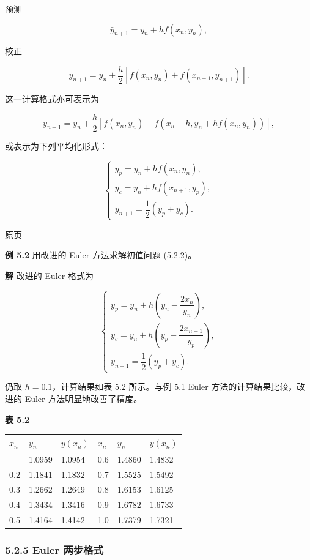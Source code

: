 \documentclass[
  10pt,
  fontset=fandol]{ctexart}
\newcounter{none} %
\begin{document}
预测

\[
\bar y_{n+1}=y_n+hf(x_n,y_n),\tag{5.2.10}
\]

校正

\[
y_{n+1}=y_n+\frac{h}{2}[f(x_n,y_n)+f(x_{n+1},\bar y_{n+1})].\tag{5.2.11}
\]

这一计算格式亦可表示为

\[
y_{n+1}=y_n+\frac{h}{2}[f(x_n,y_n)+f(x_n+h,y_n+hf(x_n,y_n))],\tag{5.2.12}
\]

或表示为下列平均化形式：

\[
\begin{cases}
y_p=y_n+hf(x_n,y_n),\\
y_c=y_n+hf(x_{n+1},y_p),\\
y_{n+1}=\dfrac{1}{2}(y_p+y_c).
\end{cases}
\]

\href{../../source-images/pdf-124.jpeg}{原页}

\textbf{例 5.2} 用改进的 Euler 方法求解初值问题 (5.2.2)。

\textbf{解} 改进的 Euler 格式为

\[
\begin{cases}
y_p=y_n+h\left(y_n-\dfrac{2x_n}{y_n}\right),\\
y_c=y_n+h\left(y_p-\dfrac{2x_{n+1}}{y_p}\right),\\
y_{n+1}=\dfrac{1}{2}(y_p+y_c).
\end{cases}
\]

仍取 \(h=0.1\)，计算结果如表 5.2 所示。与例 5.1 Euler 方法的计算结果比较，改进的 Euler 方法明显地改善了精度。

\textbf{表 5.2}

{\def\LTcaptype{none} %
\begin{longtable}[]{@{}llllll@{}}
\toprule\noalign{}
\(x_n\) & \(y_n\) & \(y(x_n)\) & \(x_n\) & \(y_n\) & \(y(x_n)\) \\
\midrule\noalign{}
\endhead
\bottomrule\noalign{}
\endlastfoot
0.1 & 1.0959 & 1.0954 & 0.6 & 1.4860 & 1.4832 \\
0.2 & 1.1841 & 1.1832 & 0.7 & 1.5525 & 1.5492 \\
0.3 & 1.2662 & 1.2649 & 0.8 & 1.6153 & 1.6125 \\
0.4 & 1.3434 & 1.3416 & 0.9 & 1.6782 & 1.6733 \\
0.5 & 1.4164 & 1.4142 & 1.0 & 1.7379 & 1.7321 \\
\end{longtable}
}

\subsubsection{5.2.5 Euler 两步格式}\label{euler-ux4e24ux6b65ux683cux5f0f}
\end{document}

